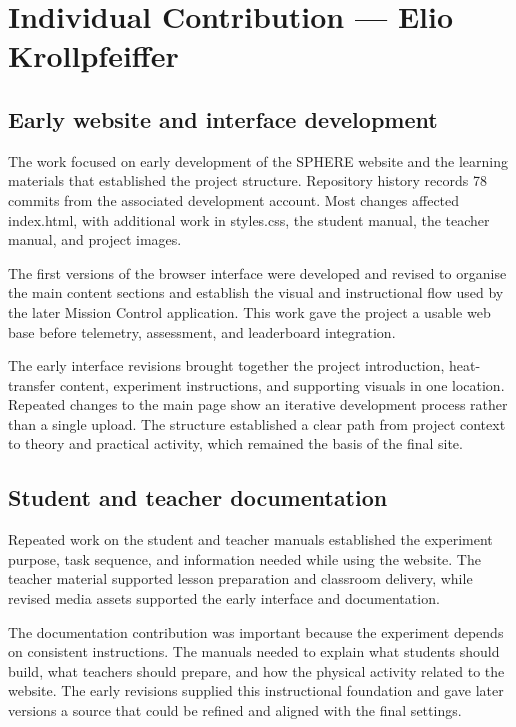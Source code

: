 \documentclass[10pt,conference,a4paper]{IEEEtran}
\begin{document}
\endgroup

\begingroup\normalsize\setlength{\parskip}{2pt}

\section*{Individual Contribution --- Elio Krollpfeiffer}

\subsection*{Early website and interface development}

The work focused on early development of the SPHERE website and the learning materials that established the project structure. Repository history records 78 commits from the associated development account. Most changes affected index.html, with additional work in styles.css, the student manual, the teacher manual, and project images.

The first versions of the browser interface were developed and revised to organise the main content sections and establish the visual and instructional flow used by the later Mission Control application. This work gave the project a usable web base before telemetry, assessment, and leaderboard integration.

The early interface revisions brought together the project introduction, heat-transfer content, experiment instructions, and supporting visuals in one location. Repeated changes to the main page show an iterative development process rather than a single upload. The structure established a clear path from project context to theory and practical activity, which remained the basis of the final site.

\subsection*{Student and teacher documentation}

Repeated work on the student and teacher manuals established the experiment purpose, task sequence, and information needed while using the website. The teacher material supported lesson preparation and classroom delivery, while revised media assets supported the early interface and documentation.

The documentation contribution was important because the experiment depends on consistent instructions. The manuals needed to explain what students should build, what teachers should prepare, and how the physical activity related to the website. The early revisions supplied this instructional foundation and gave later versions a source that could be refined and aligned with the final settings.
\end{document}
